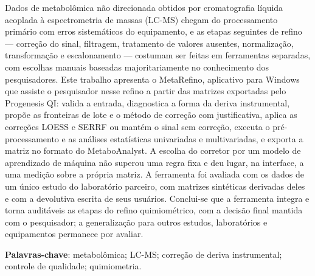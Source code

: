 
\setlength{\absparsep}{18pt} %
\begin{resumo}[Resumo]

 Dados de metabolômica não direcionada obtidos por cromatografia líquida acoplada à espectrometria de massas (LC-MS) chegam do processamento primário com erros sistemáticos do equipamento, e as etapas seguintes de refino — correção do sinal, filtragem, tratamento de valores ausentes, normalização, transformação e escalonamento — costumam ser feitas em ferramentas separadas, com escolhas manuais baseadas majoritariamente no conhecimento dos pesquisadores. Este trabalho apresenta o MetaRefino, aplicativo para Windows que assiste o pesquisador nesse refino a partir das matrizes exportadas pelo Progenesis QI: valida a entrada, diagnostica a forma da deriva instrumental, propõe as fronteiras de lote e o método de correção com justificativa, aplica as correções LOESS e SERRF ou mantém o sinal sem correção, executa o pré-processamento e as análises estatísticas univariadas e multivariadas, e exporta a matriz no formato do MetaboAnalyst. A escolha do corretor por um modelo de aprendizado de máquina não superou uma regra fixa e deu lugar, na interface, a uma medição sobre a própria matriz. A ferramenta foi avaliada com os dados de um único estudo do laboratório parceiro, com matrizes sintéticas derivadas deles e com a devolutiva escrita de seus usuários. Conclui-se que a ferramenta integra e torna auditáveis as etapas do refino quimiométrico, com a decisão final mantida com o pesquisador; a generalização para outros estudos, laboratórios e equipamentos permanece por avaliar.
\vspace{\onelineskip}

 \noindent
 \textbf{Palavras-chave}: metabolômica; LC-MS; correção de deriva instrumental; controle de qualidade; quimiometria.
\end{resumo}

